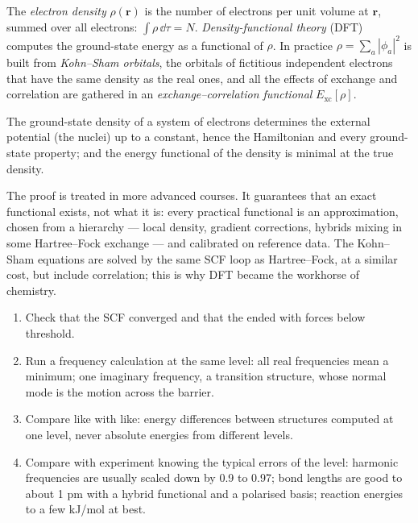 \begin{definition}\label{def:b3:computational-chemistry:dft}
The \emph{electron density} $\rho(\mathbf r)$ is the
number of electrons per unit volume at $\mathbf r$, summed over all electrons:
$\int\rho\,\dd\tau = N$. \emph{Density-functional theory}
(DFT) computes the ground-state energy as a functional of $\rho$. In
practice $\rho = \sum_a|\phi_a|^2$ is built from \emph{Kohn--Sham
orbitals}, the orbitals of fictitious independent
electrons that have the same density as the real ones, and all the effects
of exchange and correlation are gathered in an \emph{exchange--correlation
functional} $E_{\mathrm{xc}}[\rho]$.
\end{definition}

\begin{theorem}\label{thm:b3:computational-chemistry:hohenberg-kohn}
The ground-state density of a system of electrons determines the external
potential (the nuclei) up to a constant, hence the Hamiltonian and every
ground-state property; and the energy functional of the density is
minimal at the true density.
\end{theorem}
\admitted

The proof is treated in more advanced courses. It guarantees that an exact
functional exists, not what it is: every practical functional is an
approximation, chosen from a hierarchy --- local density, gradient
corrections, hybrids mixing in some Hartree--Fock exchange --- and
calibrated on reference data. The Kohn--Sham equations are solved by the
same SCF loop as Hartree--Fock, at a similar cost, but include correlation;
this is why DFT became the workhorse of chemistry.

\begin{method}\label{met:b3:computational-chemistry:read-calculation}
\begin{enumerate}
  \item Check that the SCF converged and that the  ended
        with forces below threshold.
  \item Run a frequency calculation at the same level: all real frequencies
        mean a minimum; one imaginary frequency, a transition structure, whose
        normal mode is the motion across the barrier.
  \item Compare like with like: energy differences between structures
        computed at one level, never absolute energies from different levels.
  \item Compare with experiment knowing the typical errors of the level:
        harmonic frequencies are usually scaled down by 0.9 to 0.97;
        bond lengths are good to about 1 pm with a hybrid functional and a
        polarised basis; reaction energies to a few \unit{kJ/mol} at best.
\end{enumerate}
\end{method}

